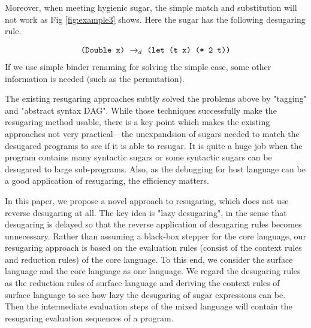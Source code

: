 Moreover, when meeting hygienic sugar, the simple match and substitution will not work as Fig \ref{fig:example3} shows. Here the  sugar has the following desugaring rule.

\[
\begin{array}{l}
\texttt{(Double x)} ~\rightarrow_d~ \texttt{(let (t x) (* 2 t))}\\
\end{array}
\]
If we use simple binder renaming for solving the simple case, some other information is needed (such as the permutation).



The existing resugaring approaches subtly solved the problems above by "tagging"\cite{resugaring} and "abstract syntax DAG"\cite{hygienic}. While those techniques successfully make the resugaring method usable, there is a key point which makes the existing approaches not very practical---the unexpandsion of sugars needed to match the desugared programs to see if it is able to resugar. It is quite a huge job when the program contains many syntactic sugars or some syntactic sugars can be desugared to large sub-programs.
Also, as the debugging for host language can be a good application of resugaring, the efficiency matters.



\label{mark:mention}
In this paper, we propose a novel approach to resugaring, which does not use reverse desugaring at all.
The key idea is "lazy desugaring", in the sense that desugaring is delayed so that the reverse application of desugaring rules becomes unnecessary. Rather than assuming a black-box stepper for the core language, our resugaring approach is based on the evaluation rules (consist of the context rules and reduction rules) of the core language.
To this end, we consider the surface language and the core language as one language. We regard the desugaring rules as the reduction rules of surface language and deriving the context rules of surface language to see how lazy the desugaring of sugar expressions can be. Then the intermediate evaluation steps of the mixed language will contain the resugaring evaluation sequences of a program.


